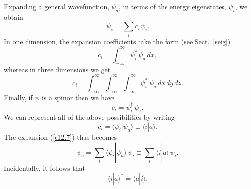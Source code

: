 Expanding a general wavefunction, $\psi_a$, in terms of the energy
eigenstates, $\psi_i$, we obtain
\begin{equation}\label{e12.7}
\psi_a = \sum_i c_i\,\psi_i.
\end{equation}
In one dimension, the expansion coefficients take the form (see Sect.~\ref{seig})
\begin{equation}
c_i = \int_{-\infty}^\infty\psi_i^\ast\,\psi_a\,dx,
\end{equation}
whereas in three dimensions we get
\begin{equation}
c_i = \int_{-\infty}^\infty\int_{-\infty}^\infty\int_{-\infty}^\infty\psi_i^\ast\,\psi_a\,dx\,dy\,dz.
\end{equation}
Finally, if $\psi$ is a spinor then we have
\begin{equation}
c_i = \psi_i^\dag\,\psi_a.
\end{equation}
We can represent all of the above possibilities by
writing
\begin{equation}
c_i =\langle\psi_i|\psi_a\rangle\equiv \langle i|a\rangle.
\end{equation}
The expansion (\ref{e12.7}) thus becomes
\begin{equation}\label{e12.13a}
\psi_a = \sum_i\langle\psi_i|\psi_a\rangle\,\psi_i\equiv \sum_i \langle i|a\rangle\,\psi_i.
\end{equation}
Incidentally, it follows that
\begin{equation}
\langle i|a\rangle^\ast=\langle a| i\rangle.
\end{equation}

